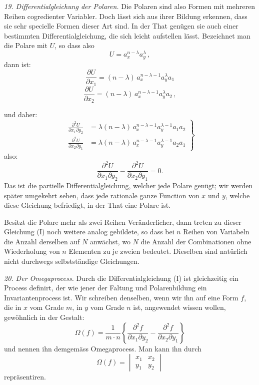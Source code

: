 \documentclass[11pt]{article}
\providecommand{\weberpage}[1]{}
\providecommand{\weq}[2]{\begin{equation}\tag{#1}#2\end{equation}}
\let\Omega\varOmega
\begin{document}
\textit{19. Differentialgleichung der Polaren.} Die Polaren sind also Formen mit mehreren Reihen cogredienter Variabler. Doch lässt sich aus ihrer Bildung erkennen, dass sie sehr specielle Formen dieser Art sind. In der That genügen sie auch einer bestimmten Differentialgleichung, die sich leicht aufstellen lässt. Bezeichnet man die Polare mit $U$, so dass also
\[
U = a_x^{n-\lambda}a_y^\lambda\,,
\]
dann ist:
\[
\frac{\partial U}{\partial x_1} = (n-\lambda)\,a_x^{n-\lambda-1}a_y^\lambda a_1
\]
\[
\frac{\partial U}{\partial x_2} = (n-\lambda)\,a_x^{n-\lambda-1}a_y^\lambda a_2\,,
\]


\weberpage{22}
und daher:
\[
\left.\begin{aligned}
\frac{\partial^2 U}{\partial x_1\partial y_2} &= \lambda(n-\lambda)\,a_x^{n-\lambda-1}a_y^{\lambda-1}a_1a_2 \\
\frac{\partial^2 U}{\partial x_2\partial y_1} &= \lambda(n-\lambda)\,a_x^{n-\lambda-1}a_y^{\lambda-1}a_2a_1
\end{aligned}\right\}
\]
also:
\weq{I}{\frac{\partial^2 U}{\partial x_1\partial y_2} - \frac{\partial^2 U}{\partial x_2\partial y_1} = 0.}
Das ist die partielle Differentialgleichung, welcher jede Polare genügt; wir werden später umgekehrt sehen, dass jede rationale ganze Function von $x$ und $y$, welche diese Gleichung befriedigt, in der That eine Polare ist.

Besitzt die Polare mehr als zwei Reihen Veränderlicher, dann treten zu dieser Gleichung (I) noch weitere analog gebildete, so dass bei $n$ Reihen von Variabeln die Anzahl derselben auf $N$ anwächst, wo $N$ die Anzahl der Combinationen ohne Wiederholung von $n$ Elementen zu je zweien bedeutet. Dieselben sind natürlich nicht durchwegs selbstständige Gleichungen.

\textit{20. Der Omegaprocess.} Durch die Differentialgleichung (I) ist gleichzeitig ein Process definirt, der wie jener der Faltung und Polarenbildung ein Invariantenprocess ist. Wir schreiben denselben, wenn wir ihn auf eine Form $f$, die in $x$ vom Grade $m$, in $y$ vom Grade $n$ ist, angewendet wissen wollen, gewöhnlich in der Gestalt:
\[
\Omega(f) = \frac{1}{m\cdot n}\left\{\frac{\partial^2 f}{\partial x_1\partial y_2} - \frac{\partial^2 f}{\partial x_2\partial y_1}\right\}
\]
und nennen ihn demgemäss Omegaprocess. Man kann ihn durch
\[
\Omega(f) = \begin{vmatrix} x_1 & x_2 \\ y_1 & y_2 \end{vmatrix}
\]
repräsentiren.
\end{document}

